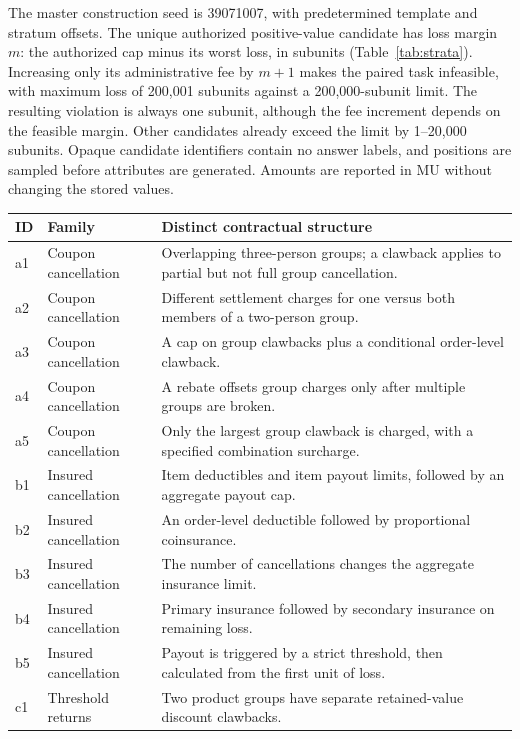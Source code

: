\documentclass[11pt]{article}
\begin{document}
The master construction seed is 39071007, with predetermined template and stratum offsets. The unique authorized positive-value candidate has loss margin $m$: the authorized cap minus its worst loss, in subunits (Table~\ref{tab:strata}). Increasing only its administrative fee by $m+1$ makes the paired task infeasible, with maximum loss of 200,001 subunits against a 200,000-subunit limit. The resulting violation is always one subunit, although the fee increment depends on the feasible margin. Other candidates already exceed the limit by 1--20,000 subunits. Opaque candidate identifiers contain no answer labels, and positions are sampled before attributes are generated. Amounts are reported in MU without changing the stored values.

\begin{table}[!tbp]
\centering\small
\begin{tabular}{llp{10.4cm}}
\toprule
ID & Family & Distinct contractual structure \\
\midrule
a1 & Coupon cancellation & Overlapping three-person groups; a clawback applies to partial but not full group cancellation.\\
a2 & Coupon cancellation & Different settlement charges for one versus both members of a two-person group.\\
a3 & Coupon cancellation & A cap on group clawbacks plus a conditional order-level clawback.\\
a4 & Coupon cancellation & A rebate offsets group charges only after multiple groups are broken.\\
a5 & Coupon cancellation & Only the largest group clawback is charged, with a specified combination surcharge.\\
\midrule
b1 & Insured cancellation & Item deductibles and item payout limits, followed by an aggregate payout cap.\\
b2 & Insured cancellation & An order-level deductible followed by proportional coinsurance.\\
b3 & Insured cancellation & The number of cancellations changes the aggregate insurance limit.\\
b4 & Insured cancellation & Primary insurance followed by secondary insurance on remaining loss.\\
b5 & Insured cancellation & Payout is triggered by a strict threshold, then calculated from the first unit of loss.\\
\midrule
c1 & Threshold returns & Two product groups have separate retained-value discount clawbacks.\\

\end{tabular}
\end{table}
\end{document}
